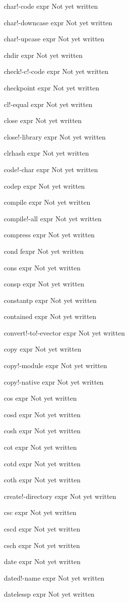 \documentclass[a4paper,11pt]{article}
\begin{document}
\begin{description}
char!-code expr
Not yet written

char!-downcase expr
Not yet written

char!-upcase expr
Not yet written

chdir expr
Not yet written

check!-c!-code expr
Not yet written

checkpoint expr
Not yet written

cl!-equal expr
Not yet written

close expr
Not yet written

close!-library expr
Not yet written

clrhash expr
Not yet written

code!-char expr
Not yet written

codep expr
Not yet written

compile expr
Not yet written

compile!-all expr
Not yet written

compress expr
Not yet written

cond fexpr
Not yet written

cons expr
Not yet written

consp expr
Not yet written

constantp expr
Not yet written

contained expr
Not yet written

convert!-to!-evector expr
Not yet written

copy expr
Not yet written

copy!-module expr
Not yet written

copy!-native expr
Not yet written

cos expr
Not yet written

cosd expr
Not yet written

cosh expr
Not yet written

cot expr
Not yet written

cotd expr
Not yet written

coth expr
Not yet written

create!-directory expr
Not yet written

csc expr
Not yet written

cscd expr
Not yet written

csch expr
Not yet written

date expr
Not yet written

dated!-name expr
Not yet written

datelessp expr
Not yet written


\end{description}
\end{document}

